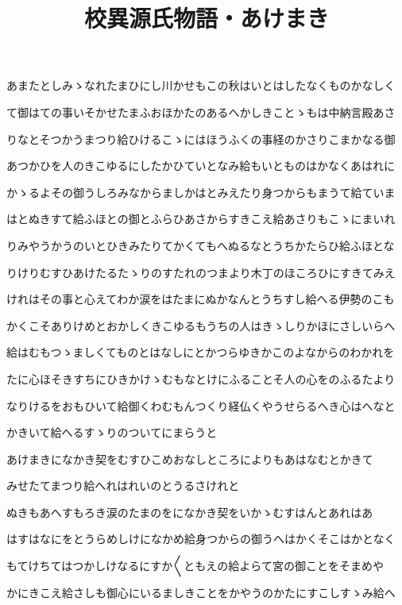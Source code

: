 \documentclass[a4paper,11pt,landscape]{ltjtarticle}
\title{校異源氏物語・あけまき}
\date{}
\begin{document}
\maketitle

あまたとしみゝなれたまひにし川かせもこの秋はいとはしたなくものかなしく
\par\medskip
て御はての事いそかせたまふおほかたのあるへかしきことゝもは中納言殿あさ
\par\medskip
りなとそつかうまつり給ひけるこゝにはほうふくの事経のかさりこまかなる御
\par\medskip
あつかひを人のきこゆるにしたかひていとなみ給もいとものはかなくあはれに
\par\medskip
かゝるよその御うしろみなからましかはとみえたり身つからもまうて給ていま
\par\medskip
はとぬきすて給ふほとの御とふらひあさからすきこえ給あさりもこゝにまいれ
\par\medskip
りみやうかうのいとひきみたりてかくてもへぬるなとうちかたらひ給ふほとな
\par\medskip
りけりむすひあけたるたゝりのすたれのつまより木丁のほころひにすきてみえ
\par\medskip
けれはその事と心えてわか涙をはたまにぬかなんとうちすし給へる伊勢のこも
\par\medskip
かくこそありけめとおかしくきこゆるもうちの人はきゝしりかほにさしいらへ
\par\medskip
給はむもつゝましくてものとはなしにとかつらゆきかこのよなからのわかれを
\par\medskip
たに心ほそきすちにひきかけゝむもなとけにふることそ人の心をのふるたより
\par\medskip
なりけるをおもひいて給御くわむもんつくり経仏くやうせらるへき心はへなと
\par\medskip
かきいて給へるすゝりのついてにまらうと
\par\medskip
あけまきになかき契をむすひこめおなしところによりもあはなむとかきて
\par\medskip
みせたてまつり給へれはれいのとうるさけれと
\par\medskip
ぬきもあへすもろき涙のたまのをになかき契をいかゝむすはんとあれはあ
\par\medskip
はすはなにをとうらめしけになかめ給身つからの御うへはかくそこはかとなく
\par\medskip
もてけちてはつかしけなるにすか〱ともえの給よらて宮の御ことをそまめや
\par\medskip
かにきこえ給さしも御心にいるましきことをかやうのかたにすこしすゝみ給へ
\par\medskip
\end{document}
